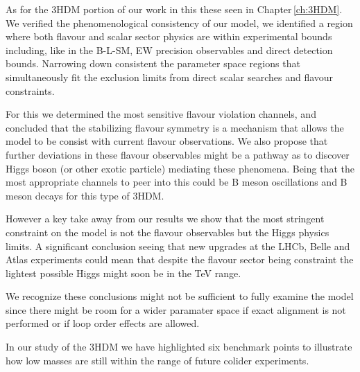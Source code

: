 \documentclass[10pt]{book}
\renewcommand{\(}{\left(}
\renewcommand{\)}{\right)}
\renewcommand{\[}{\left[}
\renewcommand{\]}{\right]}
\begin{document}

As for the 3HDM portion of our work in this these seen in  Chapter\,\ref{ch:3HDM}. 
%
We verified the phenomenological consistency of our model, we identified a region where both flavour and scalar sector physics are within experimental bounds including, like in the B-L-SM, EW precision observables and direct detection bounds.  
%
%
Narrowing down consistent the parameter space regions that simultaneously fit the exclusion limits from direct scalar searches and flavour constraints. 

For this we determined the most sensitive flavour violation channels, and concluded that the stabilizing flavour symmetry is a mechanism that allows the model to be consist with current flavour observations. 
%
We also propose that further deviations in these flavour observables might be a pathway as to discover Higgs boson (or other exotic particle) mediating these phenomena. 
%
Being that the most appropriate channels to peer into this could be B meson oscillations and B meson decays for this type of 3HDM.

However a key take away from our results we show that the most stringent constraint on the model is not the flavour observables but the Higgs physics limits. 
%
A significant conclusion seeing that new upgrades at the LHCb, Belle and Atlas experiments could mean that despite the flavour sector being constraint the lightest possible Higgs might soon be in the TeV range. 

We recognize these conclusions might not be sufficient to fully examine the model since there might be room for a wider paramater space if exact alignment is not performed or if loop order effects are allowed.

In our study of the 3HDM we have highlighted six benchmark points to illustrate how low masses are still within the range of future colider experiments.


\end{document}
